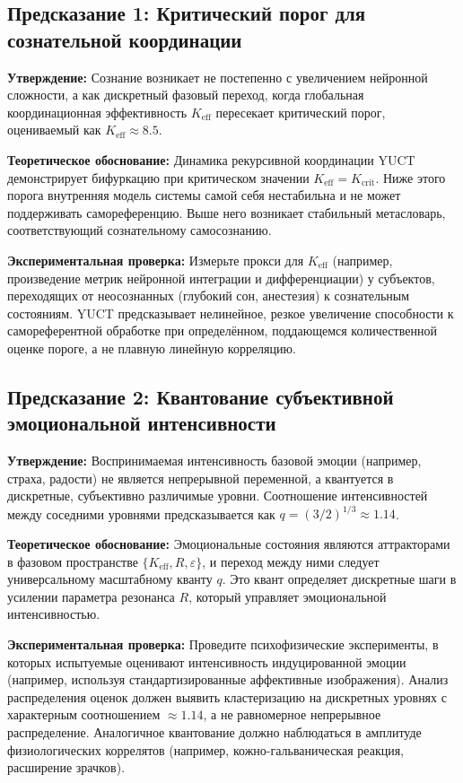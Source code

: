 \documentclass[12pt,a4paper]{article}
\begin{document}
	\subsection{Предсказание 1: Критический порог для сознательной координации}
	
	\textbf{Утверждение:} Сознание возникает не постепенно с увеличением нейронной сложности, а как дискретный фазовый переход, когда глобальная координационная эффективность \(K_{\mathrm{eff}}\) пересекает критический порог, оцениваемый как \(K_{\mathrm{eff}} \approx 8.5\).
	
	\textbf{Теоретическое обоснование:} Динамика рекурсивной координации YUCT демонстрирует бифуркацию при критическом значении \(K_{\mathrm{eff}} = K_{\mathrm{crit}}\). Ниже этого порога внутренняя модель системы самой себя нестабильна и не может поддерживать самореференцию. Выше него возникает стабильный метасловарь, соответствующий сознательному самосознанию.
	
	\textbf{Экспериментальная проверка:} Измерьте прокси для \(K_{\mathrm{eff}}\) (например, произведение метрик нейронной интеграции и дифференциации) у субъектов, переходящих от неосознанных (глубокий сон, анестезия) к сознательным состояниям. YUCT предсказывает нелинейное, резкое увеличение способности к самореферентной обработке при определённом, поддающемся количественной оценке пороге, а не плавную линейную корреляцию.
	
	\subsection{Предсказание 2: Квантование субъективной эмоциональной интенсивности}
	
	\textbf{Утверждение:} Воспринимаемая интенсивность базовой эмоции (например, страха, радости) не является непрерывной переменной, а квантуется в дискретные, субъективно различимые уровни. Соотношение интенсивностей между соседними уровнями предсказывается как \(q = (3/2)^{1/3} \approx 1.14\).
	
	\textbf{Теоретическое обоснование:} Эмоциональные состояния являются аттракторами в фазовом пространстве \(\{K_{\mathrm{eff}}, R, \varepsilon\}\), и переход между ними следует универсальному масштабному кванту \(q\). Это квант определяет дискретные шаги в усилении параметра резонанса \(R\), который управляет эмоциональной интенсивностью.
	
	\textbf{Экспериментальная проверка:} Проведите психофизические эксперименты, в которых испытуемые оценивают интенсивность индуцированной эмоции (например, используя стандартизированные аффективные изображения). Анализ распределения оценок должен выявить кластеризацию на дискретных уровнях с характерным соотношением \(\approx 1.14\), а не равномерное непрерывное распределение. Аналогичное квантование должно наблюдаться в амплитуде физиологических коррелятов (например, кожно-гальваническая реакция, расширение зрачков).
	
\end{document}
